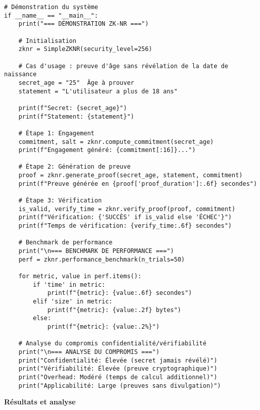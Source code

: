 \documentclass[12pt,a4paper]{article}
\begin{document}
\begin{lstlisting}[caption=Prototype ZK-NR (Zero-Knowledge Non-Repudiation)]
# Démonstration du système
if __name__ == "__main__":
    print("=== DÉMONSTRATION ZK-NR ===")
    
    # Initialisation
    zknr = SimpleZKNR(security_level=256)
    
    # Cas d'usage : preuve d'âge sans révélation de la date de naissance
    secret_age = "25"  Âge à prouver
    statement = "L'utilisateur a plus de 18 ans"
    
    print(f"Secret: {secret_age}")
    print(f"Statement: {statement}")
    
    # Étape 1: Engagement
    commitment, salt = zknr.compute_commitment(secret_age)
    print(f"Engagement généré: {commitment[:16]}...")
    
    # Étape 2: Génération de preuve
    proof = zknr.generate_proof(secret_age, statement, commitment)
    print(f"Preuve générée en {proof['proof_duration']:.6f} secondes")
    
    # Étape 3: Vérification
    is_valid, verify_time = zknr.verify_proof(proof, commitment)
    print(f"Vérification: {'SUCCÈS' if is_valid else 'ÉCHEC'}")
    print(f"Temps de vérification: {verify_time:.6f} secondes")
    
    # Benchmark de performance
    print("\n=== BENCHMARK DE PERFORMANCE ===")
    perf = zknr.performance_benchmark(n_trials=50)
    
    for metric, value in perf.items():
        if 'time' in metric:
            print(f"{metric}: {value:.6f} secondes")
        elif 'size' in metric:
            print(f"{metric}: {value:.2f} bytes")
        else:
            print(f"{metric}: {value:.2%}")
    
    # Analyse du compromis confidentialité/vérifiabilité
    print("\n=== ANALYSE DU COMPROMIS ===")
    print("Confidentialité: Élevée (secret jamais révélé)")
    print("Vérifiabilité: Élevée (preuve cryptographique)")
    print("Overhead: Modéré (temps de calcul additionnel)")
    print("Applicabilité: Large (preuves sans divulgation)")
\end{lstlisting}

\textbf{Résultats et analyse}
\end{document}
